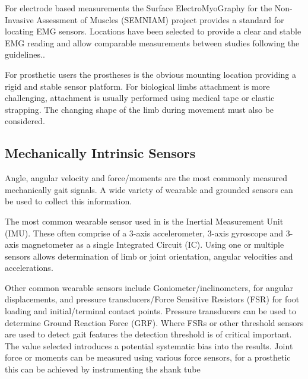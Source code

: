 For electrode based measurements the Surface ElectroMyoGraphy for the Non-Invasive Assessment of Muscles (SEMNIAM) project provides a standard for locating EMG sensors. Locations have been selected to provide a clear and stable EMG reading and allow comparable measurements between studies following the guidelines.\cite{Seniam}.


For prosthetic users the prostheses is the obvious mounting location providing a rigid and stable sensor platform. For biological limbs attachment is more challenging, attachment is usually performed using medical tape or elastic strapping. The changing shape of the limb during movement must also be considered.

\subsection{Mechanically Intrinsic Sensors}
Angle, angular velocity and force/moments are the most commonly measured mechanically gait signals. A wide variety of wearable and grounded sensors can be used to collect this information.\cite{Shull2014, Tucker2015}

The most common wearable sensor used in is the Inertial Measurement Unit (IMU)\cite{Shull2014}. These often comprise of a 3-axis accelerometer, 3-axis gyroscope and 3-axis magnetometer as a single Integrated Circuit (IC). Using one or multiple sensors allows determination of limb or joint orientation, angular velocities and accelerations.
 
Other common wearable sensors include Goniometer/inclinometers, for angular displacements, and pressure transducers/Force Sensitive Resistors (FSR) for foot loading and initial/terminal contact points. Pressure transducers can be used to determine Ground Reaction Force (GRF)\cite{Schepers2007}. Where FSRs or other threshold sensors are used to detect gait features the detection threshold is of critical important\cite{Sabatini2005}. The value selected introduces a potential systematic bias into the results. Joint force or moments can be measured using various force sensors, for a prosthetic this can be achieved by instrumenting the shank tube\cite{Schepers2007}

